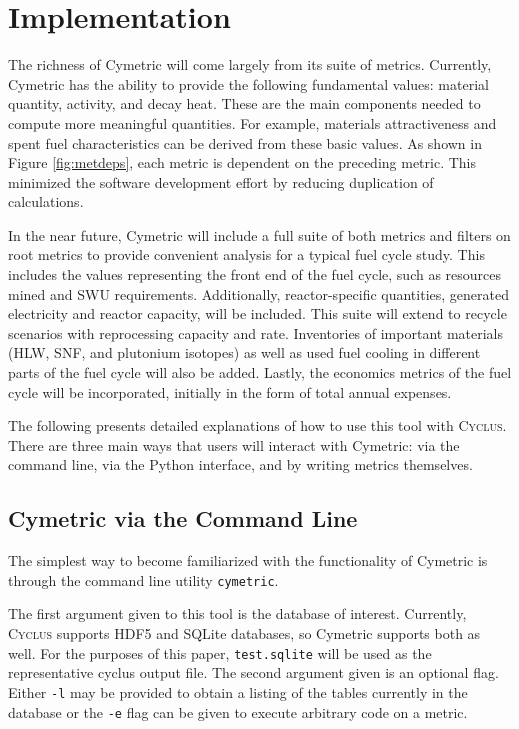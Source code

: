 \documentclass{anstrans}
\newcommand{\cyclus}{\textsc{Cyclus}\xspace}
\newcommand{\code}[1]{{\color{code}\texttt{#1}}}
\begin{document}
\section{Implementation}

The richness of Cymetric will come largely from its suite of metrics. 
Currently, Cymetric has the ability to provide the following fundamental values: 
material quantity, activity, and decay heat. 
These are the main components needed to compute more meaningful quantities.
For example, materials attractiveness and spent fuel characteristics can be derived from these basic values. 
As shown in Figure \ref{fig:metdeps}, each metric is dependent on the preceding metric. 
This minimized the software development effort by reducing duplication of calculations. 

In the near future, Cymetric will include a full suite of both metrics and filters 
on root metrics to provide convenient analysis for a typical fuel cycle study. 
This includes the values representing the front end of the fuel cycle, such as 
resources mined and \gls{SWU} requirements. Additionally, reactor-specific 
quantities, generated electricity and reactor capacity, will be included. 
This suite will extend to recycle scenarios with reprocessing capacity and rate. 
Inventories of important materials (\gls{HLW}, \gls{SNF}, and plutonium isotopes) 
as well as used fuel cooling in different parts of the fuel cycle will also be added. 
Lastly, the economics metrics of the fuel cycle will be incorporated, initially in the 
form of total annual expenses. 

The following presents detailed explanations of how to use this tool with \cyclus. 
There are three main ways that users will interact with Cymetric: 
via the command line, via the Python interface, and by writing metrics 
themselves.


\subsection{Cymetric via the Command Line}
The simplest way to become familiarized with the functionality of Cymetric 
is through the command line utility \code{cymetric}. 

The first argument given to this tool is the database of interest. 
Currently, \cyclus supports \gls{HDF5} \cite{folk2011overview} and 
\gls{SQLite} \cite{owens2006definitive} databases, 
so Cymetric supports both as well. For the purposes of this paper, 
\code{test.sqlite} will be used as the representative cyclus output file. 
The second argument given is an optional flag. Either \code{-l} may be provided to obtain 
a listing of the tables currently in the database or the \code{-e} flag 
can be given to execute arbitrary code on a metric. 
\end{document}
